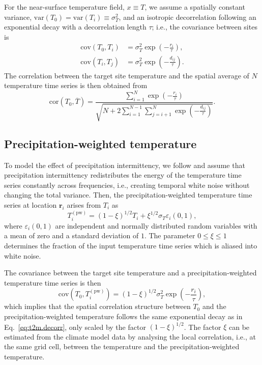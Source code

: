 \documentclass[cp, manuscript]{copernicus}
\begin{document}
For the near-surface temperature field, $x \equiv T$, we assume a spatially
constant variance, $\mathrm{var}(T_0)=\mathrm{var}(T_i)\equiv\sigma_T^2$, and an
isotropic decorrelation following an exponential decay with a decorrelation
length $\tau$; i.e., the covariance between sites is
%
\begin{align}
\label{eq:t2m.decorr}
\mathrm{cov}(T_0,T_i)&=\sigma_T^2\exp{\left(-\frac{r_i}{\tau}\right)},\\
\mathrm{cov}(T_i,T_j)&=\sigma_T^2\exp{\left(-\frac{d_{ij}}{\tau}\right)}.
\end{align}
%
The correlation between the target site temperature and the spatial average of
$N$ temperature time series is then obtained from
%
\begin{equation}
\label{eq:t2m.corr}
\mathrm{cor}(T_0,\overline{T})=
\frac{\sum_{i=1}^{N}\exp{\left(-\frac{r_i}{\tau}\right)}}
{\sqrt{N+2\sum_{i=1}^{N-1}
\sum_{j=i+1}^{N}{\exp{\left(-\frac{d_{ij}}{\tau}\right)}}}}.
\end{equation}

\subsection{Precipitation-weighted temperature}
\label{app:concept.model.t2m.pw}

To model the effect of precipitation intermittency, we follow
\citet{Laepple2018} and assume that precipitation intermittency redistributes
the energy of the temperature time series constantly across frequencies,
i.e., creating temporal white noise without changing the total variance. Then,
the precipitation-weighted temperature time series at location $\mathbf{r}_i$
arises from $T_i$ as
%
\begin{equation}
\label{eq:precip.weighting}
T_i^{\mathrm{(pw)}}=
\left(1-\xi\right)^{1/2}T_i + \xi^{1/2} \sigma_T \varepsilon_i(0,1),
\end{equation}
%
where $\varepsilon_i(0,1)$ are independent and normally distributed random
variables with a mean of zero and a standard deviation of $1$. The parameter
$0\leq\xi\leq1$ determines the fraction of the input temperature time series
which is aliased into white noise.

The covariance between the target site temperature and a precipitation-weighted
temperature time series is then
%
\begin{equation}
\label{eq:t2m.pw.decorr}
\mathrm{cov}(T_0,T_i^{\mathrm{(pw)}})=
(1-\xi)^{1/2}\sigma_T^2\exp{\left(-\frac{r_i}{\tau}\right)},
\end{equation}
%
which implies that the spatial correlation structure between $T_0$ and the
precipitation-weighted temperature follows the same exponential decay as in
Eq.~\eqref{eq:t2m.decorr}, only scaled by the factor $(1-\xi)^{1/2}$. The
factor $\xi$ can be estimated from the climate model data by analysing the local
correlation, i.e., at the same grid cell, between the temperature and the
precipitation-weighted temperature.
\end{document}
